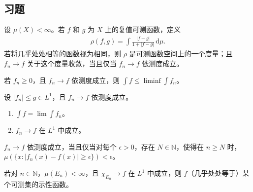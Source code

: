 \documentclass[../../main.tex]{subfiles}%
\begin{document}
\subsection*{习题}
\begin{exercise}\label{exercise:ch02-measure-metric}
设 $\mu(X)<\infty$。若 $f$ 和 $g$ 为 $X$ 上的复值可测函数，定义
\begin{align*}
\rho(f,g)=\int\frac{|f-g|}{1+|f-g|}\,\mathrm{d}\mu.
\end{align*}
若将几乎处处相等的函数视为相同，则 $\rho$ 是可测函数空间上的一个度量；且 $f_n\to f$ 关于这个度量收敛，当且仅当 $f_n\to f$ 依测度成立。
\end{exercise}
\begin{exercise}\label{exercise:ch02-fatou-in-measure}
若 $f_n\ge0$，且 $f_n\to f$ 依测度成立，则 $\int f\le\liminf\int f_n$。
\end{exercise}
\begin{exercise}\label{exercise:ch02-dominated-in-measure}
设 $|f_n|\le g\in L^1$，且 $f_n\to f$ 依测度成立。
\begin{enumerate}
\item\label{item:ch02-dominated-measure-integrals} $\int f=\lim\int f_n$。
\item\label{item:ch02-dominated-measure-lone} $f_n\to f$ 在 $L^1$ 中成立。
\end{enumerate}
\end{exercise}
\begin{exercise}\label{exercise:ch02-measure-one-epsilon}
$f_n\to f$ 依测度成立，当且仅当对每个 $\epsilon>0$，存在 $N\in\mathbb{N}$，使得在 $n\ge N$ 时，$\mu(\{x:|f_n(x)-f(x)|\ge\epsilon\})<\epsilon$。
\end{exercise}
\begin{exercise}\label{exercise:ch02-characteristic-lone-limit}
若对 $n\in\mathbb{N}$，$\mu(E_n)<\infty$，且 $\chi_{E_n}\to f$ 在 $L^1$ 中成立，则 $f$（几乎处处等于）某个可测集的示性函数。
\end{exercise}
\end{document}
